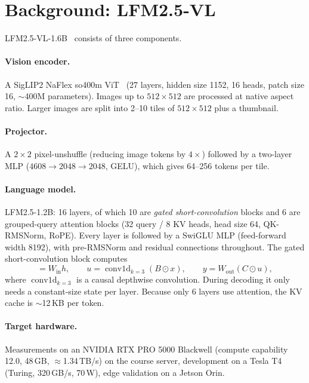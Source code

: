 \section{Background: LFM2.5-VL}
\label{sec:background}

LFM2.5-VL-1.6B~\cite{lfm2} consists of three components.

\paragraph{Vision encoder.} A SigLIP2 NaFlex so400m ViT~\cite{siglip2} (27 layers, hidden size 1152,
16 heads, patch size 16, $\sim$400M parameters). Images up to $512\times512$ are processed at native
aspect ratio. Larger images are split into 2--10 tiles of $512\times512$ plus a thumbnail.

\paragraph{Projector.} A $2\times2$ pixel-unshuffle (reducing image tokens by $4\times$) followed by a
two-layer MLP ($4608 \rightarrow 2048 \rightarrow 2048$, GELU), which gives 64--256 tokens per tile.

\paragraph{Language model.} LFM2.5-1.2B: 16 layers, of which 10 are \emph{gated short-convolution}
blocks and 6 are grouped-query attention blocks (32 query / 8 KV heads, head size 64, QK-RMSNorm, RoPE).
Every layer is followed by a SwiGLU MLP (feed-forward width 8192), with pre-RMSNorm and residual
connections throughout. The gated short-convolution block computes
\begin{equation}
  [B, C, x] = W_\text{in} h,\qquad
  u = \operatorname{conv1d}_{k=3}(B \odot x),\qquad
  y = W_\text{out}(C \odot u),
\end{equation}
where $\operatorname{conv1d}_{k=3}$ is a causal depthwise convolution. During decoding it only needs a
constant-size state per layer. Because only 6 layers use attention, the KV cache is $\sim$12\,KB per token.


\paragraph{Target hardware.} Measurements on an NVIDIA RTX PRO 5000 Blackwell (compute capability 12.0, 48\,GB, $\approx$1.34\,TB/s) on the course
server, development on a Tesla T4 (Turing, 320\,GB/s, 70\,W), edge validation on a Jetson Orin.
